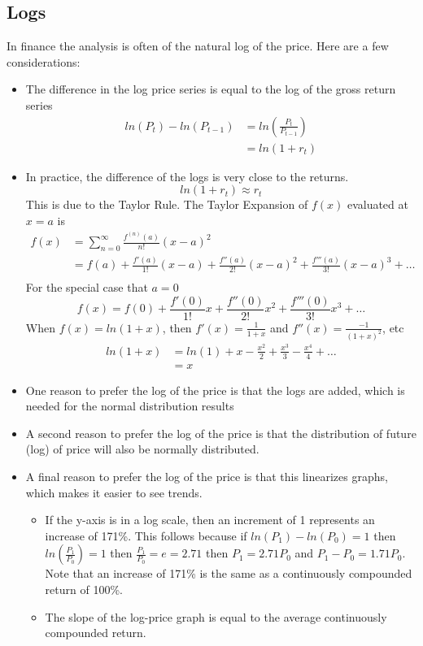 \documentclass[11pt]{article}
\theoremstyle{definition}
\begin{document}
    \subsection{Logs}
    In finance the analysis is often of the natural log of the price.   Here are a few considerations:
    \begin{itemize}
    \item The difference in the log price series is equal to the log of the gross return series
    \begin{align*}
    ln(P_t) - ln(P_{t-1}) &= ln\left(\frac{P_t}{P_{t-1}}\right)\\
    &= ln(1+r_t)
    \end{align*}
    \item In practice, the difference of the logs is very close to the returns.   
    $$ln(1+r_t) \approx r_t$$
    This is due to the Taylor Rule.   The Taylor Expansion of $f(x)$ evaluated at $x=a$ is
    \begin{align*}
        f(x) &= \sum_{n=0}^{\infty}\frac{f^{(n)}(a)}{n!}(x-a)^2 \\
            &= f(a) + \frac{f'(a)}{1!}(x-a) + \frac{f''(a)}{2!}(x-a)^2 + \frac{f'''(a)}{3!}(x-a)^3 + \dots \\
    \end{align*}
    For the special case that $a=0$
        $$f(x) = f(0) + \frac{f'(0)}{1!}x + \frac{f''(0)}{2!}x^2 + \frac{f'''(0)}{3!}x^3 + \dots$$
    When $f(x) = ln(1+x)$, then $f'(x) = \frac{1}{1+x}$ and $f''(x) = \frac{-1}{(1+x)^2}$, etc
    \begin{align*}
        ln(1+x) &= ln(1) + x -\frac{x^2}{2} + \frac{x^3}{3} - \frac{x^4}{4} + \dots\\
         &= x
    \end{align*}
    \item One reason to prefer the log of the price is that the logs are added, which is needed for the normal distribution results
    \item A second reason to prefer the log of the price is that the distribution of future (log) of price will also be normally distributed.
    \item A final reason to prefer the log of the price is that this linearizes graphs, which makes it easier to see trends.
    \begin{itemize}
    \item If the y-axis is in a log scale, then an increment of 1 represents an increase of 171\%.  This follows because if $ln(P_1) - ln(P_0) = 1$ then $ln(\frac{P_1}{P_0}) = 1$ then $ \frac{P_1}{P_0} = e = 2.71$ then $P_1 = 2.71P_0$ and $P_1 - P_0  = 1.71P_0$.   Note that an increase of 171\% is the same as a continuously compounded return of 100\%.
    \item The slope of the log-price graph is equal to the average continuously compounded return.
    \end{itemize}
    \end{itemize}
\end{document}
